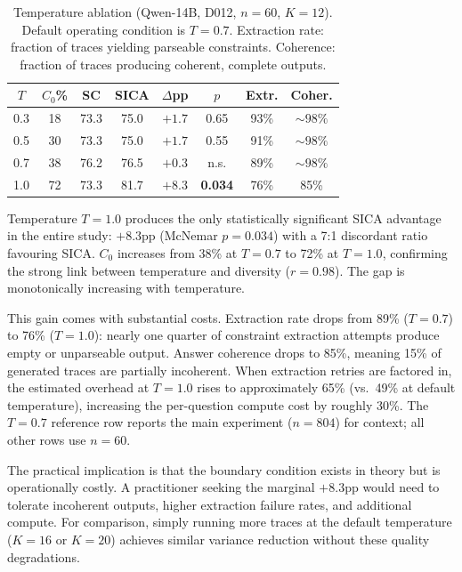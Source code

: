 \documentclass[11pt]{article}
\begin{document}
\begin{table}[t]
\centering
\caption{Temperature ablation (Qwen-14B, D012, $n{=}60$, $K{=}12$). Default operating condition is $T{=}0.7$. Extraction rate: fraction of traces yielding parseable constraints. Coherence: fraction of traces producing coherent, complete outputs.}
\label{tab:temperature}
\small
\begin{tabular}{@{}cccccccc@{}}
\toprule
$T$ & $C_0$\% & SC & SICA & $\Delta$pp & $p$ & Extr. & Coher. \\
\midrule
0.3 & 18 & 73.3 & 75.0 & $+1.7$ & 0.65 & 93\% & ${\sim}98\%$ \\
0.5 & 30 & 73.3 & 75.0 & $+1.7$ & 0.55 & 91\% & ${\sim}98\%$ \\
0.7 & 38 & 76.2 & 76.5 & $+0.3$ & n.s. & 89\% & ${\sim}98\%$ \\
1.0 & 72 & 73.3 & 81.7 & $+8.3$ & \textbf{0.034} & 76\% & 85\% \\
\bottomrule
\end{tabular}
\end{table}

Temperature $T{=}1.0$ produces the only statistically significant SICA advantage in the entire study: $+8.3$pp (McNemar $p{=}0.034$) with a 7:1 discordant ratio favouring SICA.
$C_0$ increases from 38\% at $T{=}0.7$ to 72\% at $T{=}1.0$, confirming the strong link between temperature and diversity ($r{=}0.98$).
The gap is monotonically increasing with temperature.

This gain comes with substantial costs.
Extraction rate drops from 89\% ($T{=}0.7$) to 76\% ($T{=}1.0$): nearly one quarter of constraint extraction attempts produce empty or unparseable output.
Answer coherence drops to 85\%, meaning 15\% of generated traces are partially incoherent.
When extraction retries are factored in, the estimated overhead at $T{=}1.0$ rises to approximately 65\% (vs.\ 49\% at default temperature), increasing the per-question compute cost by roughly 30\%.
The $T{=}0.7$ reference row reports the main experiment ($n{=}804$) for context; all other rows use $n{=}60$.

The practical implication is that the boundary condition exists in theory but is operationally costly.
A practitioner seeking the marginal $+8.3$pp would need to tolerate incoherent outputs, higher extraction failure rates, and additional compute.
For comparison, simply running more traces at the default temperature ($K{=}16$ or $K{=}20$) achieves similar variance reduction without these quality degradations.
\end{document}
